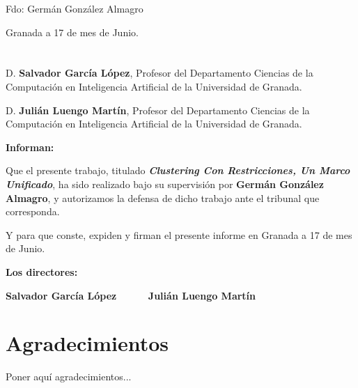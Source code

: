 \vspace{6cm}

\noindent Fdo: Germán González Almagro

\vspace{2cm}

\begin{flushright}
Granada a 17 de mes de Junio.
\end{flushright}


\chapter*{}
\thispagestyle{empty}


D. \textbf{Salvador García López}, Profesor del Departamento Ciencias de la Computación en Inteligencia Artificial de la Universidad de Granada.

\vspace{0.5cm}

D. \textbf{Julián Luengo Martín}, Profesor del Departamento Ciencias de la Computación en Inteligencia Artificial de la Universidad de Granada.


\vspace{0.5cm}

\textbf{Informan:}

\vspace{0.5cm}

Que el presente trabajo, titulado \textit{\textbf{Clustering Con Restricciones, Un Marco Unificado}},
ha sido realizado bajo su supervisión por \textbf{Germán González Almagro}, y autorizamos la defensa de dicho trabajo ante el tribunal
que corresponda.

\vspace{0.5cm}

Y para que conste, expiden y firman el presente informe en Granada a 17 de mes de Junio.

\vspace{1cm}

\textbf{Los directores:}

\vspace{5cm}

\noindent \textbf{Salvador García López \ \ \ \ \ Julián  Luengo Martín}

\chapter*{Agradecimientos}
\thispagestyle{empty}

       \vspace{1cm}


Poner aquí agradecimientos...

